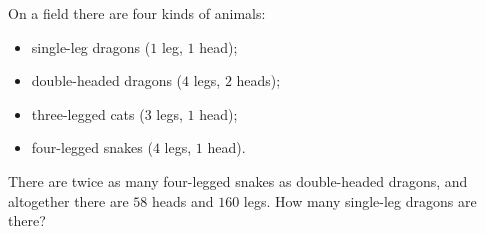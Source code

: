 On a field there are four kinds of animals:
\begin{itemize}
\item single-leg dragons ($1$ leg, $1$ head);
\item double-headed dragons ($4$ legs, $2$ heads);
\item three-legged cats ($3$ legs, $1$ head);
\item four-legged snakes ($4$ legs, $1$ head).
\end{itemize}
There are twice as many four-legged snakes as double-headed dragons, and altogether there are $58$ heads and $160$ legs. How many single-leg dragons are there?
